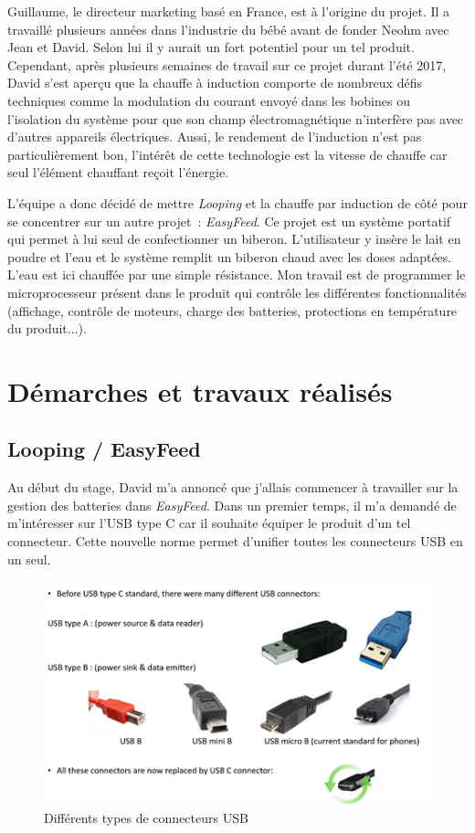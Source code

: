 \documentclass[a4paper, 12pt, sffamily]{report}
\begin{document}
Guillaume, le directeur marketing basé en France, est à l’origine du projet. Il a travaillé plusieurs années dans l’industrie du bébé avant de fonder Neohm avec Jean et David. Selon lui il y aurait un fort potentiel pour un tel produit.
Cependant, après plusieurs semaines de travail sur ce projet durant l’été 2017, David s’est aperçu que la chauffe à induction comporte de nombreux défis techniques comme la modulation du courant envoyé dans les bobines ou l’isolation du système pour que son champ électromagnétique n’interfère pas avec d’autres appareils électriques. Aussi, le rendement de l’induction n’est pas particulièrement bon, l’intérêt de cette technologie est la vitesse de chauffe car seul l’élément chauffant reçoit l’énergie.

L’équipe a donc décidé de mettre \emph{Looping} et la chauffe par induction de côté pour se concentrer sur un autre projet~: \emph{EasyFeed}. Ce projet est un système portatif qui permet à lui seul de confectionner un biberon. L’utilisateur y insère le lait en poudre et l’eau et le système remplit un biberon chaud avec les doses adaptées. L’eau est ici chauffée par une simple résistance.
Mon travail est de programmer le microprocesseur présent dans le produit qui contrôle les différentes fonctionnalités (affichage, contrôle de moteurs, charge des batteries, protections en température du produit...).

\chapter{Démarches et travaux réalisés}
\section{Looping / EasyFeed}
Au début du stage, David m’a annoncé que j'allais commencer à travailler sur la gestion des batteries dans \emph{EasyFeed}. Dans un premier temps, il m'a demandé de m’intéresser sur l’USB type C car il souhaite équiper le produit d’un tel connecteur. Cette nouvelle norme permet d’unifier toutes les connecteurs USB en un seul.

\begin{figure}[H]
\centering
\includegraphics[scale=0.75]{figures/screenshots/different_usb_types.png}
\caption{Différents types de connecteurs USB}
\label{fig:usb_type}
\end{figure}
\end{document}
